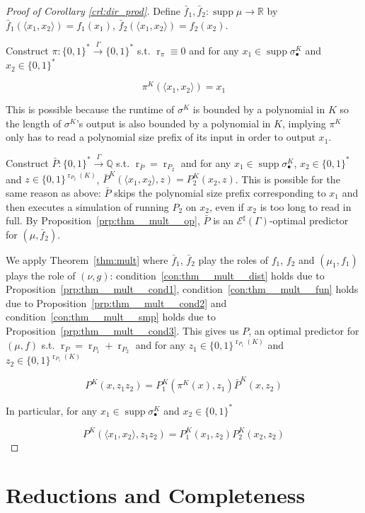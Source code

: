 \documentclass{article}
\numberwithin{equation}{section}
\theoremstyle{definition}
\theoremstyle{plain}
\newcommand{\Bool}{\{0,1\}}
\newcommand{\Words}{{\Bool^*}}
\DeclareMathOperator{\Supp}{supp}
\DeclareMathOperator{\R}{r}
\newcommand{\Rats}{\mathbb{Q}}
\newcommand{\Reals}{\mathbb{R}}
\newcommand{\Chev}[1]{\langle #1 \rangle}
\newcommand{\Fall}{\mathcal{E}}
\newcommand{\ESG}{\Fall^\sharp(\Gamma)}
\newcommand{\Scheme}{\xrightarrow{\Gamma}}
\begin{document}
\begin{proof}[Proof of Corollary \ref{crl:dir_prod}]

Define $\bar{f}_1, \bar{f}_2: \Supp \mu \rightarrow \Reals$ by $\bar{f}_1(\Chev{x_1,x_2})=f_1(x_1)$, $\bar{f}_2(\Chev{x_1,x_2})=f_2(x_2)$. 

Construct $\pi: \Words \Scheme \Words$ s.t. $\R_\pi \equiv 0$ and for any ${x_1 \in \Supp \sigma_\bullet^K}$ and $x_2 \in \Words$ 

\[\pi^K(\Chev{x_1,x_2})=x_1\]

This is possible because the runtime of $\sigma^K$ is bounded by a polynomial in $K$ so the length of $\sigma^K$'s output is also bounded by a polynomial in $K$, implying $\pi^K$ only has to read a polynomial size prefix of its input in order to output $x_1$.

Construct $\bar{P}: \Words \Scheme \Rats$ s.t. $\R_{\bar{P}}=\R_{P_2}$ and for any $x_1 \in \Supp \sigma_\bullet^K$, $x_2 \in \Words$ and $z \in \Bool^{\R_{P_2}(K)}$, $\bar{P}^K(\Chev{x_1,x_2},z)=P_2^K(x_2,z)$. This is possible for the same reason as above: $\bar{P}$ skips the polynomial size prefix corresponding to $x_1$ and then executes a simulation of running $P_2$ on $x_2$, even if $x_2$ is too long to read in full. By Proposition~\ref{prp:thm__mult__op}, $\bar{P}$ is an $\ESG$-optimal predictor for $(\mu,\bar{f}_2)$. 

We apply Theorem~\ref{thm:mult} where $\bar{f}_1$, $\bar{f}_2$ play the roles of $f_1$, $f_2$ and $(\mu_1, f_1)$ plays the role of $(\nu,g)$: condition~\ref{con:thm__mult__dist} holds due to Proposition~\ref{prp:thm__mult__cond1}, condition~\ref{con:thm__mult__fun} holds due to Proposition~\ref{prp:thm__mult__cond2} and condition~\ref{con:thm__mult__smp} holds due to Proposition~\ref{prp:thm__mult__cond3}. This gives us $P$, an optimal predictor for $(\mu, f)$ s.t. ${\R_P=\R_{P_1}+\R_{P_2}}$ and for any ${z_1 \in \Bool^{\R_{P_1}(K)}}$ and $z_2 \in \Bool^{\R_{P_1}(K)}$ 

\[P^K(x, z_1 z_2) = P_1^K(\pi^K(x),z_1) \bar{P}^K(x,z_2)\]

In particular, for any ${x_1 \in \Supp \sigma_\bullet^K}$ and $x_2 \in \Words$

\[P^K(\Chev{x_1,x_2}, z_1 z_2)=P_1^K(x_1,z_2)P_2^K(x_2,z_2)\]
%
\end{proof}

\section{Reductions and Completeness}
\label{sec:reductions}
\end{document}
